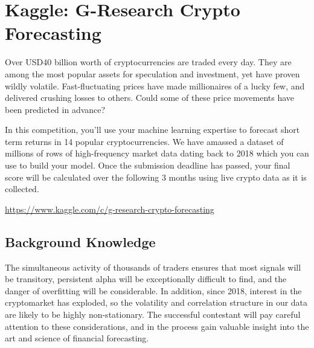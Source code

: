 \documentclass[11pt]{article}
\begin{document}
\newpage 

\section{Kaggle: G-Research Crypto Forecasting}

Over USD40 billion worth of cryptocurrencies are traded every day. They are among the most popular assets for speculation and investment, yet have proven wildly volatile. Fast-fluctuating prices have made millionaires of a lucky few, and delivered crushing losses to others. Could some of these price movements have been predicted in advance?

In this competition, you'll use your machine learning expertise to forecast short term returns in 14 popular cryptocurrencies. We have amassed a dataset of millions of rows of high-frequency market data dating back to 2018 which you can use to build your model. Once the submission deadline has passed, your final score will be calculated over the following 3 months using live crypto data as it is collected.

\url{https://www.kaggle.com/c/g-research-crypto-forecasting}



\subsection{Background Knowledge}
The simultaneous activity of thousands of traders ensures that most signals will be transitory, persistent alpha will be exceptionally difficult to find, and the danger of overfitting will be considerable. In addition, since 2018, interest in the cryptomarket has exploded, so the volatility and correlation structure in our data are likely to be highly non-stationary. The successful contestant will pay careful attention to these considerations, and in the process gain valuable insight into the art and science of financial forecasting.
\end{document}
